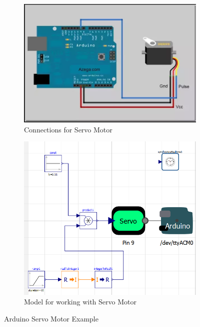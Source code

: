 \documentclass[12pt,a4paper]{report}
\begin{document}
\begin{figure}[H]
\begin{subfigure}{.5\textwidth}
\centering
\includegraphics[width =\linewidth]{7}
\caption{Connections for Servo Motor}
\end{subfigure}
\begin{subfigure}{.5\textwidth}
\centering
\includegraphics[width =\linewidth]{servo_ex3}
\caption{Model for working with Servo Motor}
\end{subfigure}
\caption {Arduino Servo Motor Example}
\label{figure:20}
\end{figure}
\end{document}

